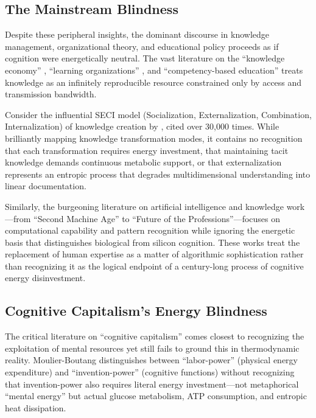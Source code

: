 \subsection{The Mainstream Blindness}

Despite these peripheral insights, the dominant discourse in knowledge management, organizational theory, and educational policy proceeds as if cognition were energetically neutral. The vast literature on the ``knowledge economy'' \citep{powell2004}, ``learning organizations'' \citep{senge1990}, and ``competency-based education'' \citep{mulder2007} treats knowledge as an infinitely reproducible resource constrained only by access and transmission bandwidth.

Consider the influential SECI model (Socialization, Externalization, Combination, Internalization) of knowledge creation by \citet{nonaka1995}, cited over 30,000 times. While brilliantly mapping knowledge transformation modes, it contains no recognition that each transformation requires energy investment, that maintaining tacit knowledge demands continuous metabolic support, or that externalization represents an entropic process that degrades multidimensional understanding into linear documentation.

Similarly, the burgeoning literature on artificial intelligence and knowledge work---from \citet{brynjolfsson2014} ``Second Machine Age'' to \citet{susskind2020} ``Future of the Professions''---focuses on computational capability and pattern recognition while ignoring the energetic basis that distinguishes biological from silicon cognition. These works treat the replacement of human expertise as a matter of algorithmic sophistication rather than recognizing it as the logical endpoint of a century-long process of cognitive energy disinvestment.

\subsection{Cognitive Capitalism's Energy Blindness}

The critical literature on ``cognitive capitalism'' \citep{moulierboutang2007, vercellone2007} comes closest to recognizing the exploitation of mental resources yet still fails to ground this in thermodynamic reality. Moulier-Boutang distinguishes between ``labor-power'' (physical energy expenditure) and ``invention-power'' (cognitive functions) without recognizing that invention-power also requires literal energy investment---not metaphorical ``mental energy'' but actual glucose metabolism, ATP consumption, and entropic heat dissipation.

